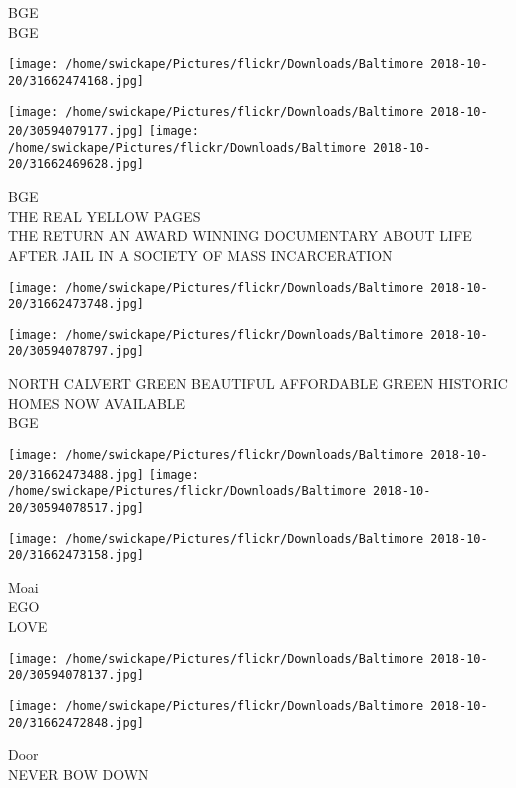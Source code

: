 \documentclass[10pt,letterpaper]{article}
\begin{document}
BGE\\
BGE\\
\pagebreak

\texttt{[image: /home/swickape/Pictures/flickr/Downloads/Baltimore 2018-10-20/31662474168.jpg]}

\vspace{0.25in}
\texttt{[image: /home/swickape/Pictures/flickr/Downloads/Baltimore 2018-10-20/30594079177.jpg]}
\texttt{[image: /home/swickape/Pictures/flickr/Downloads/Baltimore 2018-10-20/31662469628.jpg]}

BGE\\
THE REAL YELLOW PAGES\\
THE RETURN AN AWARD WINNING DOCUMENTARY ABOUT LIFE AFTER JAIL IN A SOCIETY OF MASS INCARCERATION\\
\pagebreak

\texttt{[image: /home/swickape/Pictures/flickr/Downloads/Baltimore 2018-10-20/31662473748.jpg]}

\vspace{0.25in}
\texttt{[image: /home/swickape/Pictures/flickr/Downloads/Baltimore 2018-10-20/30594078797.jpg]}

NORTH CALVERT GREEN BEAUTIFUL AFFORDABLE GREEN HISTORIC HOMES NOW AVAILABLE\\
BGE\\
\pagebreak

\texttt{[image: /home/swickape/Pictures/flickr/Downloads/Baltimore 2018-10-20/31662473488.jpg]}
\texttt{[image: /home/swickape/Pictures/flickr/Downloads/Baltimore 2018-10-20/30594078517.jpg]}

\texttt{[image: /home/swickape/Pictures/flickr/Downloads/Baltimore 2018-10-20/31662473158.jpg]}

Moai\\
EGO\\
LOVE\\
\pagebreak

\texttt{[image: /home/swickape/Pictures/flickr/Downloads/Baltimore 2018-10-20/30594078137.jpg]}

\vspace{0.25in}
\texttt{[image: /home/swickape/Pictures/flickr/Downloads/Baltimore 2018-10-20/31662472848.jpg]}

Door\\
NEVER BOW DOWN\\
\pagebreak
\end{document}
